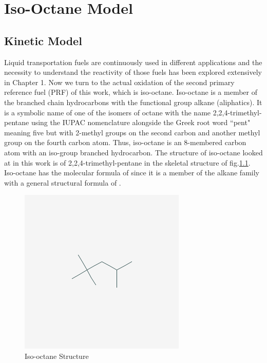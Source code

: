 \chapter{Iso-Octane Model}
\section{Kinetic Model}

Liquid transportation fuels are continuously used in different applications and the necessity to understand the reactivity of those fuels has been explored extensively in Chapter 1. Now we turn to the actual oxidation of the second primary reference fuel (PRF) of this work, which is iso-octane. Iso-octane is a member of the branched chain hydrocarbons with the functional group alkane (aliphatics). It is a symbolic name of one of the isomers of octane with the name 2,2,4-trimethyl-pentane using the IUPAC nomenclature alongside the Greek root word ``pent" meaning five but with 2-methyl groups on the second carbon and another methyl group on the fourth carbon atom. Thus, iso-octane is an 8-membered carbon atom with an iso-group branched hydrocarbon. The structure of iso-octane looked at in this work is of 2,2,4-trimethyl-pentane in the skeletal structure of fig.\ref{fig:iso-octane}. Iso-octane has the molecular formula of  since it is a member of the alkane family with a general structural formula of . 

\begin{figure}
    \centering
    \includegraphics[scale=0.5, keepaspectratio]{images/2,2,4-Trimethylpentane_300.png}
    \caption{Iso-octane Structure}
    \label{fig:iso-octane}
\end{figure}

\vspace{2.5cm}


